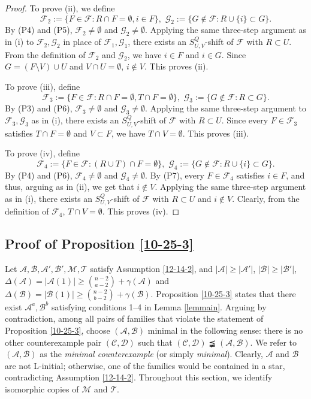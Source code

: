 \documentclass[11pt]{article}
\def\marrow{{\boldmath {\marginpar[\hfill$\rightarrow \rightarrow$]{$\leftarrow \leftarrow$}}}}
\def\andrey#1{{\sc Andrey: }{\marrow\sf \textcolor{blue}{#1}}}
\newcommand{\m}{\mathcal}
\begin{document}
\begin{proof}
To prove (ii), we define
\[
\m F_2:=\{F\in \m F: R\cap F =\emptyset, i\in F\}, \,\, \m G_2:=\{G\not\in \m F: R\cup \{i\}\subset G\}.
\]
By (P4) and (P5), %
$\m F_2\ne \emptyset$ and $\m G_2\ne \emptyset$. Applying the same three-step argument as in (i) to $\m F_2,\m G_2$ in place of $\m F_1,\m G_1$, there exists an $S_{U,V}^Q$-shift of $\m F$ with $R\subset U$. 
From the definition of $\m F_2$ and $\m G_2$, we have $i\in F$ and $i \in G$. Since $G=(F\setminus V)\cup U$ and $V\cap U=\emptyset$, $i\not\in V$. This proves (ii).

To prove (iii), define
\[
\m F_3:=\{F\in \m F: R\cap F =\emptyset, T\cap F =\emptyset\}, \,\, \m G_3:=\{G\not\in \m F: R\subset G\}.
\]
By (P3) and (P6), 
$\m F_3\ne \emptyset$ and $\m G_3\ne \emptyset$. Applying the same three-step argument to $\m F_3,\m G_3$ as in (i), there exists an $S_{U,V}^Q$-shift of $\m F$ with $R\subset U$. Since every $F\in\mathcal F_3$ satisfies $T\cap F=\emptyset$ and $V\subset F$, we have $T\cap V=\emptyset$. This proves (iii).


To prove (iv), define
\[
\m F_4:=\{F\in \m F: (R\cup T)\cap F =\emptyset\}, \,\, \m G_4:=\{G\not\in \m F: R\cup \{i\}\subset G\}.
\]
By (P4) and (P6),
$\m F_4\ne \emptyset$ and $\m G_4\ne \emptyset$. By (P7), every $F\in \m F_4$ satisfies $i\in F$, and thus, arguing as in (ii), we get that $i\notin V.$ Applying the same three-step argument as in (i), there exists an $S_{U,V}^Q$-shift of $\m F$ with $R\subset U$ and $i\not\in V$. Clearly, from the definition of $\m F_4$, $T\cap V=\emptyset$. This proves (iv).
\end{proof}

\subsection{Proof of Proposition \ref{10-25-3}}\label{proof}

Let $\m A, \m B, \m A', \m B', \m M, \m T$ satisfy Assumption \ref{12-14-2}, and $|\m A|\ge |\m A'|$, $|\m B|\ge |\m B'|$, 
$\Delta(\mathcal{A})=|\mathcal{A}(1)|\ge {n-2\choose a-2}+\gamma(\mathcal{A})$ and 
$\Delta(\mathcal{B})=|\mathcal{B}(1)|\ge {n-2\choose b-2}+\gamma(\mathcal{B})$.
Proposition \ref{10-25-3} states that there exist $\m A^a, \m B^b$ satisfying conditions 1--4 in Lemma \ref{lemmain}.
Arguing by contradiction, among all pairs of families that violate the statement of Proposition \ref{10-25-3}, choose $(\mathcal{A}, \mathcal{B})$ minimal in the following sense: there is no other counterexample pair $(\mathcal{C}, \mathcal{D})$  such that $(\mathcal{C}, \mathcal{D}) \precneqq (\mathcal{A}, \mathcal{B})$. We refer to $(\m A, \m B)$ as the \emph{minimal counterexample} (or simply \emph{minimal}). 
Clearly, $\mathcal{A}$ and $\mathcal{B}$ are not L-initial; otherwise, one of the families would be contained in a star, contradicting Assumption \ref{12-14-2}. Throughout this section, we identify isomorphic copies of
$\mathcal M$ and $\mathcal T$.
\end{document}
